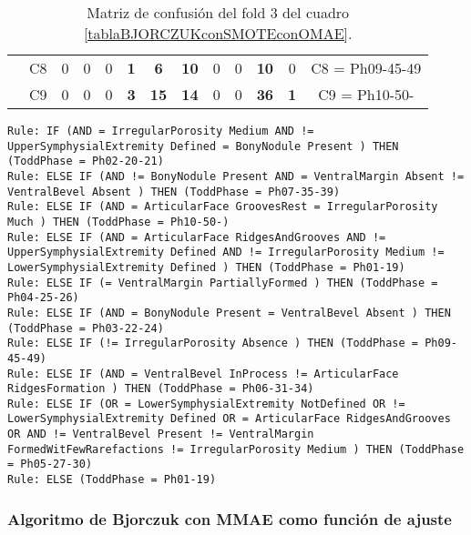 \begin{table}[H]
{\begin{tabular}{|ccrrrrrrrrrrc|}
\multicolumn{1}{|c|}{}                                      & \multicolumn{1}{c|}{C8} & \multicolumn{1}{c|}{0}          & \multicolumn{1}{c|}{0}  & \multicolumn{1}{c|}{0}          & \multicolumn{1}{c|}{\textbf{1}} & \multicolumn{1}{c|}{\textbf{6}}  & \multicolumn{1}{c|}{\textbf{10}} & \multicolumn{1}{c|}{0}          & \multicolumn{1}{c|}{0}  & \multicolumn{1}{c|}{\textbf{10}} & \multicolumn{1}{c|}{0}          & C8 = Ph09-45-49   \\ \cline{2-13}
\multicolumn{1}{|c|}{}                                      & \multicolumn{1}{c|}{C9} & \multicolumn{1}{c|}{0}          & \multicolumn{1}{c|}{0}  & \multicolumn{1}{c|}{0}          & \multicolumn{1}{c|}{\textbf{3}} & \multicolumn{1}{c|}{\textbf{15}} & \multicolumn{1}{c|}{\textbf{14}} & \multicolumn{1}{c|}{0}          & \multicolumn{1}{c|}{0}  & \multicolumn{1}{c|}{\textbf{36}} & \multicolumn{1}{c|}{\textbf{1}} & C9 = Ph10-50-     \\ \hline
\end{tabular}%
}
\caption{Matriz de confusión del fold 3 del cuadro \ref{tablaBJORCZUKconSMOTEconOMAE}.}
\end{table}

\begin{lstlisting}
Rule: IF (AND = IrregularPorosity Medium AND != UpperSymphysialExtremity Defined = BonyNodule Present ) THEN (ToddPhase = Ph02-20-21)
Rule: ELSE IF (AND != BonyNodule Present AND = VentralMargin Absent != VentralBevel Absent ) THEN (ToddPhase = Ph07-35-39)
Rule: ELSE IF (AND = ArticularFace GroovesRest = IrregularPorosity Much ) THEN (ToddPhase = Ph10-50-)
Rule: ELSE IF (AND = ArticularFace RidgesAndGrooves AND != UpperSymphysialExtremity Defined AND != IrregularPorosity Medium != LowerSymphysialExtremity Defined ) THEN (ToddPhase = Ph01-19)
Rule: ELSE IF (= VentralMargin PartiallyFormed ) THEN (ToddPhase = Ph04-25-26)
Rule: ELSE IF (AND = BonyNodule Present = VentralBevel Absent ) THEN (ToddPhase = Ph03-22-24)
Rule: ELSE IF (!= IrregularPorosity Absence ) THEN (ToddPhase = Ph09-45-49)
Rule: ELSE IF (AND = VentralBevel InProcess != ArticularFace RidgesFormation ) THEN (ToddPhase = Ph06-31-34)
Rule: ELSE IF (OR = LowerSymphysialExtremity NotDefined OR != LowerSymphysialExtremity Defined OR = ArticularFace RidgesAndGrooves OR AND != VentralBevel Present != VentralMargin FormedWitFewRarefactions != IrregularPorosity Medium ) THEN (ToddPhase = Ph05-27-30)
Rule: ELSE (ToddPhase = Ph01-19)
\end{lstlisting}

\subsubsection{Algoritmo de Bjorczuk con MMAE como función de ajuste}


